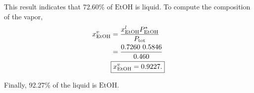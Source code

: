 \documentclass[main.tex]{subfiles}
\begin{document}
This result indicates that 72.60\% of $\mathrm{EtOH}$ is liquid.
To compute the composition of the vapor,
\begin{align*}
   x^v_{\ce{EtOH}} &= \frac{x^l_{\ce{EtOH}} P^*_{\mathrm{EtOH}}}{P_{\mathrm{tot}}} \\
   &= \frac{0.7260~0.5846}{0.460} \\
   &\boxed{x^v_{\ce{EtOH}}= 0.9227.}
\end{align*}

Finally, 92.27\% of the liquid is $\mathrm{EtOH}$.
\end{document}
